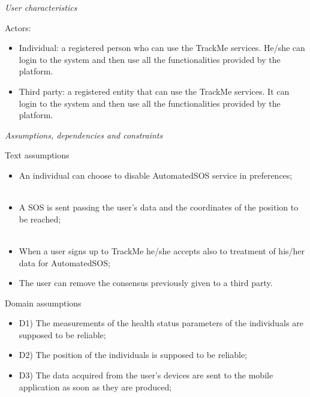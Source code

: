 \documentclass{article}
\begin{document}
\begin{legal}
\begin{legal}
{\begin{itemize}
		\end{itemize}
		}
		\item \textit{User characteristics} \\
			{\normalfont
			Actors:\\
			\begin{itemize}
			 \item Individual: a registered person who can use the TrackMe services. He/she can login to the system and then use all the functionalities provided by the platform.\\
			\item Third party: a registered entity that can use the TrackMe services. It can login to the system and then use all the functionalities provided by the platform.\\
			\end{itemize}
			}
		\item \textit{Assumptions, dependencies and constraints}
			\begin{legal}
    			\item Text assumptions\\
    			{\normalfont
				\begin{itemize}
					\item An individual can choose to disable AutomatedSOS service in preferences;\\\
					\item A SOS is sent passing the user's data and the coordinates of the position to be reached;\\\
					\item When a user signs up to TrackMe he/she accepts also to treatment of his/her data for AutomatedSOS;\\
					\item The user can remove the consensus previously given to a third party.\\
				\end{itemize}}
			\newpage
			\item Domain assumptions \\
			{\normalfont
				\begin{itemize}
				\item D1) The measurements of the health status parameters of the individuals are supposed to be reliable;\\
				\item D2) The position of the individuals is supposed to be reliable;\\
				\item D3) The data acquired from the user’s devices are sent to the mobile application as soon as they are produced;\\

\end{itemize}}
\end{legal}
\end{legal}
\end{legal}
\end{document}
